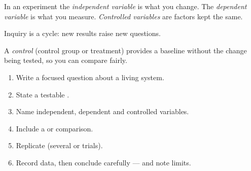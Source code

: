 \begin{definition}[Variables]\label{def:g6:method:variables}
In an experiment the \emph{independent variable}
is what you change. The \emph{dependent variable}
is what you measure. \emph{Controlled variables}
are factors kept the same.
\end{definition}

\begin{omfigure}

{\small Inquiry is a cycle: new results raise new questions.}
\end{omfigure}

\begin{definition}[Control]\label{def:g6:method:control}
A \emph{control} (control group or
treatment) provides a baseline without the change being tested, so you
can compare fairly.
\end{definition}

\begin{method}\label{met:g6:method:fair}
\begin{enumerate}
  \item Write a focused question about a living system.
  \item State a testable .
  \item Name independent, dependent and controlled variables.
  \item Include a  or comparison.
  \item Replicate (several  or trials).
  \item Record data, then conclude carefully --- and note limits.
\end{enumerate}
\end{method}

